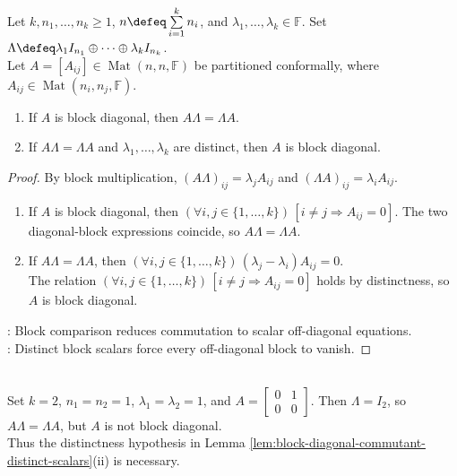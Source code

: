 \begin{lemma} \label{lem:block-diagonal-commutant-distinct-scalars} \\
Let $k,n_1,\ldots,n_k\geq1$, $n\defeq\sum\limits_{i=1}^{k}n_i$, and $\lambda_1,\ldots,\lambda_k\in\mathbb{F}$. Set $\Lambda\defeq\lambda_1 I_{n_1}\oplus\cdots\oplus\lambda_k I_{n_k}$.\\
Let $A=[A_{ij}]\in\operatorname{Mat}(n,n,\mathbb{F})$ be partitioned conformally, where $A_{ij}\in\operatorname{Mat}(n_i,n_j,\mathbb{F})$.
\begin{enumerate}[label=(\roman*)]
\setlength{\itemsep}{0pt}
\item If $A$ is block diagonal, then $A\Lambda=\Lambda A$.
\item If $A\Lambda=\Lambda A$ and $\lambda_1,\ldots,\lambda_k$ are distinct, then $A$ is block diagonal.
\end{enumerate}
\begin{proof}
By block multiplication, $(A\Lambda)_{ij}=\lambda_jA_{ij}$ and $(\Lambda A)_{ij}=\lambda_iA_{ij}$.
\begin{enumerate}[label=(\roman*)]
\setlength{\itemsep}{0pt}
\item If $A$ is block diagonal, then $(\forall i,j\in\{1,\ldots,k\})\,[i\neq j\Rightarrow A_{ij}=0]$. The two diagonal-block expressions coincide, so $A\Lambda=\Lambda A$.
\item If $A\Lambda=\Lambda A$, then $(\forall i,j\in\{1,\ldots,k\})\,(\lambda_j-\lambda_i)A_{ij}=0$.\\
The relation $(\forall i,j\in\{1,\ldots,k\})\,[i\neq j\Rightarrow A_{ij}=0]$ holds by distinctness, so $A$ is block diagonal.
\end{enumerate}
: Block comparison reduces commutation to scalar off-diagonal equations.\\
: Distinct block scalars force every off-diagonal block to vanish.
\end{proof}
\end{lemma}

\begin{counterexample} \label{cex:repeated-block-scalars-do-not-force-block-diagonality} \\
Set $k=2$, $n_1=n_2=1$, $\lambda_1=\lambda_2=1$, and $A=\left[\begin{smallmatrix}0&1\\0&0\end{smallmatrix}\right]$. Then $\Lambda=I_2$, so $A\Lambda=\Lambda A$, but $A$ is not block diagonal.\\
Thus the distinctness hypothesis in Lemma \ref{lem:block-diagonal-commutant-distinct-scalars}(ii) is necessary.
\end{counterexample}


